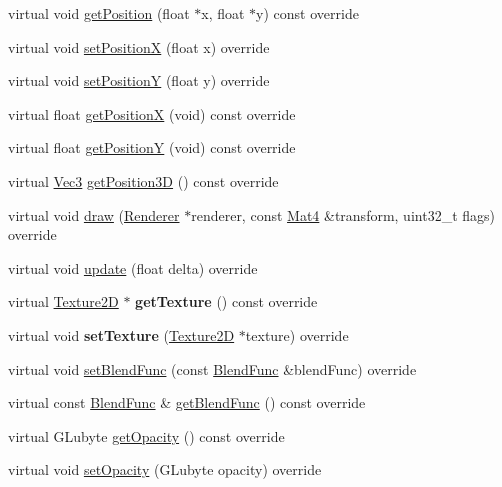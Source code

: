 \begin{DoxyCompactItemize}
virtual void \hyperlink{classMotionStreak3D_a16c2911514702c9d808d1afad8d0ece3}{get\+Position} (float $\ast$x, float $\ast$y) const override
\item 
virtual void \hyperlink{classMotionStreak3D_a9c363f74a20d8b5e83357343ecfad7d4}{set\+PositionX} (float x) override
\item 
virtual void \hyperlink{classMotionStreak3D_afb3de2f3e93486b5be3877d081159d57}{set\+PositionY} (float y) override
\item 
virtual float \hyperlink{classMotionStreak3D_a2dcc5baf8956d2fef986b564bc21ff5c}{get\+PositionX} (void) const override
\item 
virtual float \hyperlink{classMotionStreak3D_aad2e9762fabf564601865096174a9b54}{get\+PositionY} (void) const override
\item 
virtual \hyperlink{classVec3}{Vec3} \hyperlink{classMotionStreak3D_a60ec5113c30e2b81c15b43595a98ce63}{get\+Position3D} () const override
\item 
virtual void \hyperlink{classMotionStreak3D_a108b68a6e6a37a5bc307761c1d14fdaa}{draw} (\hyperlink{classRenderer}{Renderer} $\ast$renderer, const \hyperlink{classMat4}{Mat4} \&transform, uint32\+\_\+t flags) override
\item 
virtual void \hyperlink{classMotionStreak3D_a195dbdebb5c5d55d3d09c4e5dc716a91}{update} (float delta) override
\item 
\mbox{\label{classMotionStreak3D_a07b036fae5213cb44b3a6cb7b076fafe}} 
virtual \hyperlink{classTexture2D}{Texture2D} $\ast$ {\bfseries get\+Texture} () const override
\item 
\mbox{\label{classMotionStreak3D_ae1e6cb4046eeba7451e6ac03fa8e3570}} 
virtual void {\bfseries set\+Texture} (\hyperlink{classTexture2D}{Texture2D} $\ast$texture) override
\item 
virtual void \hyperlink{classMotionStreak3D_a37b0b1eb59733188836e76dfed2ab181}{set\+Blend\+Func} (const \hyperlink{structBlendFunc}{Blend\+Func} \&blend\+Func) override
\item 
virtual const \hyperlink{structBlendFunc}{Blend\+Func} \& \hyperlink{classMotionStreak3D_a74db7796ac204990d57ffb203fc7cfd1}{get\+Blend\+Func} () const override
\item 
virtual G\+Lubyte \hyperlink{classMotionStreak3D_ad801e665463b5ed5b60a2d01468ddb89}{get\+Opacity} () const override
\item 
virtual void \hyperlink{classMotionStreak3D_aebd12e84f982bb11ab3cc3c92e769f73}{set\+Opacity} (G\+Lubyte opacity) override

\end{DoxyCompactItemize}
